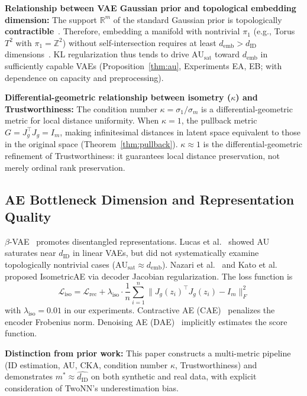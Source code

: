 \documentclass[12pt,a4paper]{article}
\newcommand{\dID}{d_{\mathrm{ID}}}
\newcommand{\Jg}{J_g}
\newcommand{\R}{\mathbb{R}}
\newcommand{\kap}{\kappa}
\newcommand{\AUsat}{\mathrm{AU}_{\mathrm{sat}}}
\newcommand{\demb}{d_{\mathrm{emb}}}
\begin{document}
\textbf{Relationship between VAE Gaussian prior and topological embedding dimension:}
The support $\R^m$ of the standard Gaussian prior is topologically \textbf{contractible}~\cite{hatcher2002algebraic}.
Therefore, embedding a manifold with nontrivial $\pi_1$ (e.g., Torus $T^2$ with $\pi_1 = \mathbb{Z}^2$) without self-intersection requires at least $\demb > \dID$ dimensions~\cite{hatcher2002algebraic,guillemin1974differential}.
KL regularization thus tends to drive $\AUsat$ toward $\demb$ in sufficiently capable VAEs
(Proposition~\ref{thm:au}, Experiments EA, EB; with dependence on capacity and preprocessing).

\textbf{Differential-geometric relationship between isometry ($\kap$) and Trustworthiness:}
The condition number $\kap = \sigma_1/\sigma_m$ is a differential-geometric metric for local distance uniformity.
When $\kap = 1$, the pullback metric $G = \Jg^\top\Jg = I_m$, making infinitesimal distances in latent space equivalent to those in the original space (Theorem~\ref{thm:pullback}).
$\kap \approx 1$ is the differential-geometric refinement of Trustworthiness: it guarantees local distance preservation, not merely ordinal rank preservation.

\subsection{AE Bottleneck Dimension and Representation Quality}

$\beta$-VAE~\cite{higgins2017betavae} promotes disentangled representations.
Lucas et al.~\cite{lucas2019elbo} showed AU saturates near $d_{\mathrm{ID}}$ in linear VAEs, but did not systematically examine topologically nontrivial cases ($\AUsat \approx \demb$).
Nazari et al.~\cite{nazari2023geometric} and Kato et al.~\cite{kato2020rdae} proposed IsometricAE via decoder Jacobian regularization.
The loss function is
\begin{equation}
  \mathcal{L}_{\mathrm{iso}} = \mathcal{L}_{\mathrm{rec}}
  + \lambda_{\mathrm{iso}} \cdot \frac{1}{n}\sum_{i=1}^{n}
    \|\Jg(z_i)^\top \Jg(z_i) - I_m\|_F^2
  \label{eq:iso_loss}
\end{equation}
with $\lambda_{\mathrm{iso}} = 0.01$ in our experiments.
Contractive AE (CAE)~\cite{rifai2011cae} penalizes the encoder Frobenius norm.
Denoising AE (DAE)~\cite{alain2014dae} implicitly estimates the score function.

\textbf{Distinction from prior work:}
This paper constructs a multi-metric pipeline (ID estimation, AU, CKA, condition number $\kap$, Trustworthiness) and demonstrates $m^* \approx \hat{\dID}$ on both synthetic and real data, with explicit consideration of TwoNN's underestimation bias.
\end{document}
